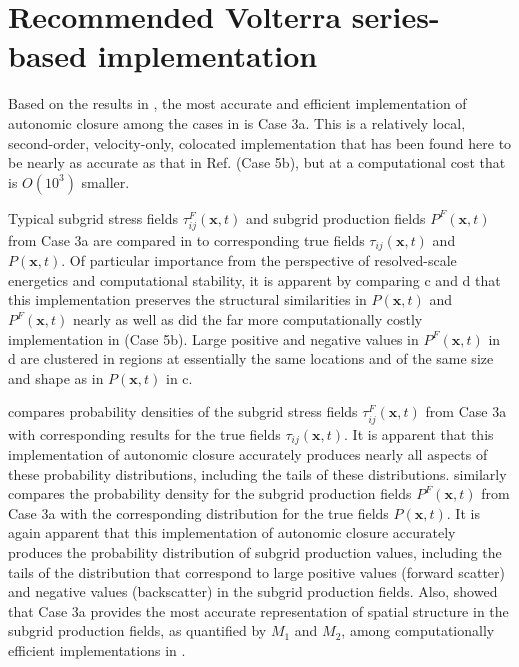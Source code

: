 \section{Recommended Volterra series-based implementation}
\label{sec:IVG}

Based on the results in , the most accurate and efficient implementation of autonomic closure among the cases in  is Case 3a. This is a relatively local, second-order, velocity-only, colocated implementation that has been found here to be nearly as accurate as that in Ref.  \cite{king2016autonomic} (Case 5b), but at a computational cost that is $O(10^3)$ smaller.  

Typical subgrid stress fields  $\tau_{ij}^{F}(\mathbf{x},t)$ and subgrid production fields $P^{F}(\mathbf{x},t)$  from Case 3a are compared in  to corresponding true fields $\tau_{ij}(\mathbf{x},t)$  and $P(\mathbf{x},t)$. Of particular importance from the perspective of resolved-scale energetics and computational stability, it is apparent by comparing c and d that this implementation preserves the structural similarities in  $P(\mathbf{x},t)$ and $P^{F}(\mathbf{x},t)$  nearly as well as did the far more computationally costly implementation in  (Case 5b). Large positive and negative values in $P^{F}(\mathbf{x},t)$ in d are clustered in regions at essentially the same locations and of the same size and shape as in $P(\mathbf{x},t)$  in c. 

 compares probability densities of the subgrid stress fields $\tau_{ij}^{F}(\mathbf{x},t)$  from Case 3a with corresponding results for the true fields $\tau_{ij}(\mathbf{x},t)$. It is apparent that this implementation of autonomic closure accurately produces nearly all aspects of these probability distributions, including the tails of these distributions.  similarly compares the probability density for the subgrid production fields $P^{F}(\mathbf{x},t)$  from Case 3a with the corresponding distribution for the true fields $P(\mathbf{x},t)$. It is again apparent that this implementation of autonomic closure accurately produces the probability distribution of subgrid production values, including the tails of the distribution that correspond to large positive values (forward scatter) and negative values (backscatter) in the subgrid production fields. Also,  showed that Case 3a provides the most accurate representation of spatial structure in the subgrid production fields, as quantified by  $M_1$ and $M_2$, among computationally efficient implementations in . 

